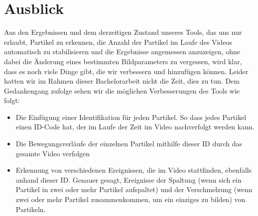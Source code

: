 \chapter{Ausblick}

Aus den Ergebnissen und dem derzeitigen Zustand unseres Tools, das uns nur erlaubt, Partikel zu erkennen, die Anzahl der Partikel im Laufe des Videos automatisch zu stabilisieren und die Ergebnisse angemessen anzuzeigen, ohne dabei die Änderung eines bestimmten Bildparameters zu vergessen, wird klar, dass es noch viele Dinge gibt, die wir verbessern und hinzufügen können. Leider hatten wir im Rahmen dieser Bachelorarbeit nicht die Zeit, dies zu tun. 
Dem Gedankengang zufolge sehen wir die möglichen Verbesserungen des Tools wie folgt: 
\begin{itemize}
 \item Die Einfügung einer Identifikation für jeden Partikel. So dass jedes Partikel einen ID-Code hat, der im Laufe der Zeit im Video nachverfolgt werden kann. 
 \item Die Bewegungsverläufe der einzelnen Partikel mithilfe dieser ID durch das gesamte Video verfolgen
 \item Erkennung von verschiedenen Ereignissen, die im Video stattfinden, ebenfalls anhand dieser ID. Genauer gesagt, Ereignisse der Spaltung (wenn sich ein Partikel in zwei oder mehr Partikel aufspaltet) und der Verschmelzung (wenn zwei oder mehr Partikel zusammenkommen, um ein einziges zu bilden) von Partikeln.
\end{itemize}